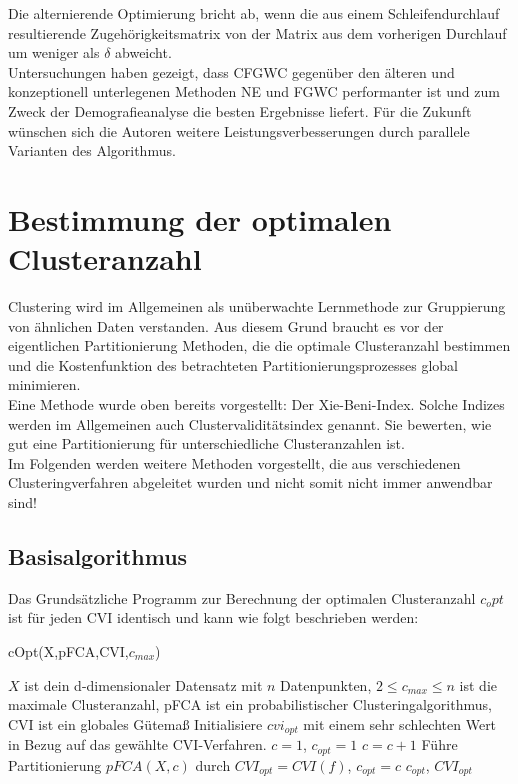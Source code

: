 \documentclass[11pt,ceqn]{book}
\begin{document}
Die alternierende Optimierung bricht ab, wenn die aus einem Schleifendurchlauf resultierende Zugehörigkeitsmatrix von der Matrix aus dem vorherigen Durchlauf um weniger als $\delta$ abweicht.
\\

Untersuchungen haben gezeigt, dass CFGWC \cite{cfgwc} gegenüber den älteren und konzeptionell unterlegenen Methoden NE \cite{ne} und FGWC \cite{fgwc} performanter ist und zum Zweck der Demografieanalyse die besten Ergebnisse liefert. Für die Zukunft wünschen sich die Autoren weitere Leistungsverbesserungen durch parallele Varianten des Algorithmus.

\section{Bestimmung der optimalen Clusteranzahl}
Clustering wird im Allgemeinen als unüberwachte Lernmethode zur Gruppierung von ähnlichen Daten verstanden. Aus diesem Grund braucht es vor der eigentlichen Partitionierung Methoden, die die optimale Clusteranzahl bestimmen und die Kostenfunktion des betrachteten Partitionierungsprozesses global minimieren.
\\
Eine Methode wurde oben bereits vorgestellt: Der Xie-Beni-Index. Solche Indizes werden im Allgemeinen auch Clustervaliditätsindex genannt. Sie bewerten, wie gut eine Partitionierung für unterschiedliche Clusteranzahlen ist.
\\
Im Folgenden werden weitere Methoden vorgestellt, die aus verschiedenen Clusteringverfahren abgeleitet wurden und nicht somit nicht immer anwendbar sind!

\subsection{Basisalgorithmus}
Das Grundsätzliche Programm zur Berechnung der optimalen Clusteranzahl $c_opt$ ist für jeden CVI identisch und kann wie folgt beschrieben werden:

\begin{algorithm}[H]
\caption{cOpt(X,pFCA,CVI,$c_{max}$)}\label{cvibase}
\begin{algorithmic}[1]
\Require $X$ ist dein d-dimensionaler Datensatz mit $n$ Datenpunkten, $2\leqslant c_{max} \leqslant n$ ist die maximale Clusteranzahl, pFCA ist ein probabilistischer Clusteringalgorithmus, CVI ist ein globales Gütemaß
\State Initialisiere $cvi_{opt}$ mit einem sehr schlechten Wert in Bezug auf das gewählte CVI-Verfahren.
\State $c=1$, $c_{opt} = 1$
\Repeat
\State $c=c+1$
\State Führe Partitionierung $pFCA(X,c)$ durch
\State $CVI_{opt} = CVI(f)$, $c_{opt} = c$
\EndIf
{}
\State \Return $c_{opt}$, $CVI_{opt}$
\end{algorithmic}
\end{algorithm} 
\end{document}
